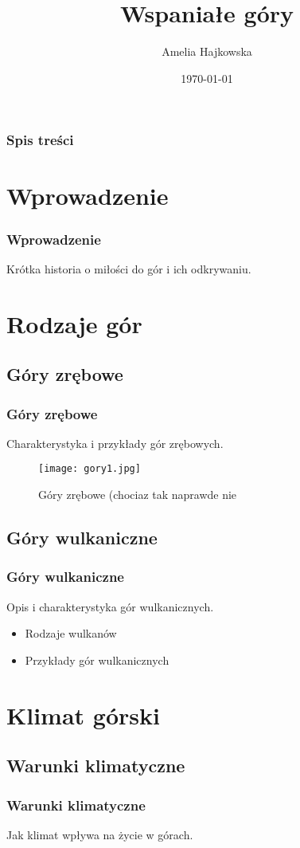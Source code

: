 \documentclass{beamer}
\title{Wspaniałe góry}
\author{Amelia Hajkowska}
\date{\today}
\begin{document}
\frame{\titlepage}

\begin{frame}
\frametitle{Spis treści}
\tableofcontents
\end{frame}

\section{Wprowadzenie}
\begin{frame}
\frametitle{Wprowadzenie}
Krótka historia o miłości do gór i ich odkrywaniu.
\end{frame}

\section{Rodzaje gór}
\subsection{Góry zrębowe}
\begin{frame}
\frametitle{Góry zrębowe}
Charakterystyka i przykłady gór zrębowych.
\begin{figure}
\texttt{[image: gory1.jpg]}
\caption{Góry zrębowe (chociaz tak naprawde nie}
\end{figure}
\end{frame}

\subsection{Góry wulkaniczne}
\begin{frame}
\frametitle{Góry wulkaniczne}
Opis i charakterystyka gór wulkanicznych.
\begin{itemize}
\item Rodzaje wulkanów
\item Przykłady gór wulkanicznych
\end{itemize}
\end{frame}

\section{Klimat górski}
\subsection{Warunki klimatyczne}
\begin{frame}
\frametitle{Warunki klimatyczne}
Jak klimat wpływa na życie w górach.
\end{frame}
\end{document}
